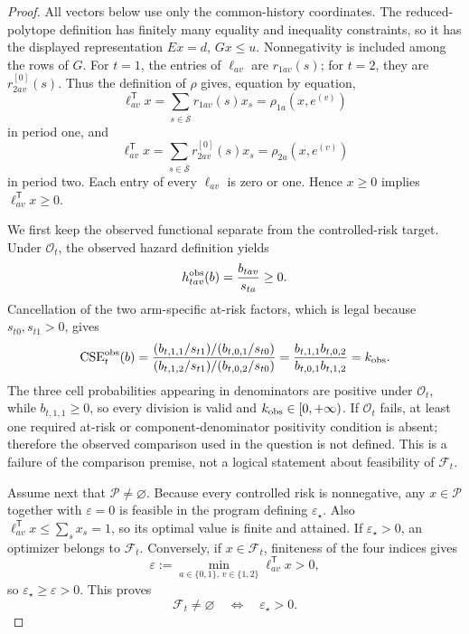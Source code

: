 \documentclass{article}
\begin{document}
\begin{proof}
All vectors below use only the common-history coordinates.  The reduced-polytope definition has finitely many equality and inequality constraints, so it has the displayed representation \(Ex=d\), \(Gx\leq u\).  Nonnegativity is included among the rows of \(G\).  For \(t=1\), the entries of \(\ell_{av}\) are \(r_{1av}(s)\); for \(t=2\), they are \(r^{[0]}_{2av}(s)\).  Thus the definition of \(\rho\) gives, equation by equation,
\[
 \ell_{av}^{\mathsf T}x
 =\sum_{s\in\overline{\mathcal S}}r_{1av}(s)x_s
 =\rho_{1a}(x,e^{(v)})
\]
in period one, and
\[
 \ell_{av}^{\mathsf T}x
 =\sum_{s\in\overline{\mathcal S}}r^{[0]}_{2av}(s)x_s
 =\rho_{2a}(x,e^{(v)})
\]
in period two.  Each entry of every \(\ell_{av}\) is zero or one.  Hence \(x\geq0\) implies \(\ell_{av}^{\mathsf T}x\geq0\).

We first keep the observed functional separate from the controlled-risk target.  Under \(\mathcal O_t\), the observed hazard definition yields
\[
 h^{\rm obs}_{tav}(b)=\frac{b_{tav}}{s_{ta}}\geq0.
\]
Cancellation of the two arm-specific at-risk factors, which is legal because \(s_{t0},s_{t1}>0\), gives
\[
 \operatorname{CSE}^{\rm obs}_t(b)
 =\frac{(b_{t,1,1}/s_{t1})/(b_{t,0,1}/s_{t0})}
 {(b_{t,1,2}/s_{t1})/(b_{t,0,2}/s_{t0})}
 =\frac{b_{t,1,1}b_{t,0,2}}{b_{t,0,1}b_{t,1,2}}
 =k_{\rm obs}.
\]
The three cell probabilities appearing in denominators are positive under \(\mathcal O_t\), while \(b_{t,1,1}\geq0\), so every division is valid and \(k_{\rm obs}\in[0,+\infty)\).  If \(\mathcal O_t\) fails, at least one required at-risk or component-denominator positivity condition is absent; therefore the observed comparison used in the question is not defined.  This is a failure of the comparison premise, not a logical statement about feasibility of \(\mathcal F_t\).

Assume next that \(\mathcal P\neq\varnothing\).  Because every controlled risk is nonnegative, any \(x\in\mathcal P\) together with \(\varepsilon=0\) is feasible in the program defining \(\varepsilon_\star\).  Also \(\ell_{av}^{\mathsf T}x\leq\sum_sx_s=1\), so its optimal value is finite and attained.  If \(\varepsilon_\star>0\), an optimizer belongs to \(\mathcal F_t\).  Conversely, if \(x\in\mathcal F_t\), finiteness of the four indices gives
\[
 \varepsilon:=\min_{a\in\{0,1\},\,v\in\{1,2\}}
       \ell_{av}^{\mathsf T}x>0,
\]
so \(\varepsilon_\star\geq\varepsilon>0\).  This proves
\[
 \mathcal F_t\neq\varnothing\quad\Longleftrightarrow\quad
 \varepsilon_\star>0.                                      \tag{1}
\]


\end{proof}
\end{document}
